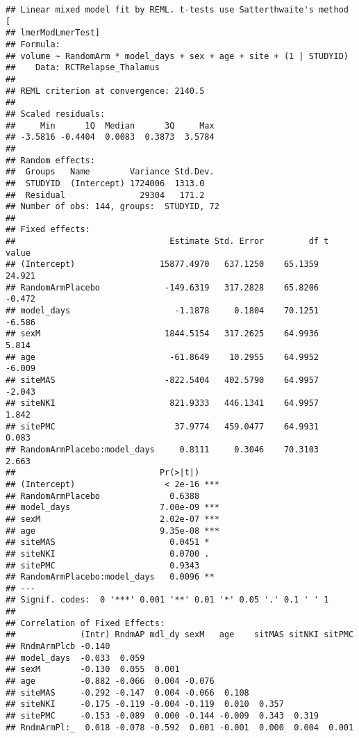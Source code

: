 \documentclass[]{article}
\theoremstyle{definition}
\theoremstyle{definition}
\theoremstyle{definition}
\theoremstyle{remark}
\begin{document}
\begin{verbatim}
## Linear mixed model fit by REML. t-tests use Satterthwaite's method [
## lmerModLmerTest]
## Formula: 
## volume ~ RandomArm * model_days + sex + age + site + (1 | STUDYID)
##    Data: RCTRelapse_Thalamus
## 
## REML criterion at convergence: 2140.5
## 
## Scaled residuals: 
##     Min      1Q  Median      3Q     Max 
## -3.5816 -0.4404  0.0083  0.3873  3.5784 
## 
## Random effects:
##  Groups   Name        Variance Std.Dev.
##  STUDYID  (Intercept) 1724006  1313.0  
##  Residual               29304   171.2  
## Number of obs: 144, groups:  STUDYID, 72
## 
## Fixed effects:
##                               Estimate Std. Error         df t value
## (Intercept)                 15877.4970   637.1250    65.1359  24.921
## RandomArmPlacebo             -149.6319   317.2828    65.8206  -0.472
## model_days                     -1.1878     0.1804    70.1251  -6.586
## sexM                         1844.5154   317.2625    64.9936   5.814
## age                           -61.8649    10.2955    64.9952  -6.009
## siteMAS                      -822.5404   402.5790    64.9957  -2.043
## siteNKI                       821.9333   446.1341    64.9957   1.842
## sitePMC                        37.9774   459.0477    64.9931   0.083
## RandomArmPlacebo:model_days     0.8111     0.3046    70.3103   2.663
##                             Pr(>|t|)    
## (Intercept)                  < 2e-16 ***
## RandomArmPlacebo              0.6388    
## model_days                  7.00e-09 ***
## sexM                        2.02e-07 ***
## age                         9.35e-08 ***
## siteMAS                       0.0451 *  
## siteNKI                       0.0700 .  
## sitePMC                       0.9343    
## RandomArmPlacebo:model_days   0.0096 ** 
## ---
## Signif. codes:  0 '***' 0.001 '**' 0.01 '*' 0.05 '.' 0.1 ' ' 1
## 
## Correlation of Fixed Effects:
##             (Intr) RndmAP mdl_dy sexM   age    sitMAS sitNKI sitPMC
## RndmArmPlcb -0.140                                                 
## model_days  -0.033  0.059                                          
## sexM        -0.130  0.055  0.001                                   
## age         -0.882 -0.066  0.004 -0.076                            
## siteMAS     -0.292 -0.147  0.004 -0.066  0.108                     
## siteNKI     -0.175 -0.119 -0.004 -0.119  0.010  0.357              
## sitePMC     -0.153 -0.089  0.000 -0.144 -0.009  0.343  0.319       
## RndmArmPl:_  0.018 -0.078 -0.592  0.001 -0.001  0.000  0.004  0.001
\end{verbatim}
\end{document}
